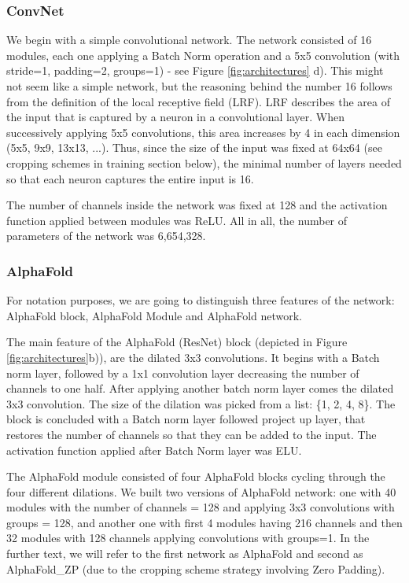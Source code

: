 \subsubsection{ConvNet}

We begin with a simple convolutional network. The network consisted of 16 modules, each one applying a Batch Norm operation and a 5x5 convolution (with stride=1, padding=2, groups=1) - see Figure \ref{fig:architectures} d). This might not seem like a simple network, but the reasoning behind the number 16 follows from the definition of the local receptive field (LRF). LRF describes the area of the input that is captured by a neuron in a convolutional layer. When successively applying 5x5 convolutions, this area increases by 4 in each dimension (5x5, 9x9, 13x13, ...). Thus, since the size of the input was fixed at 64x64 (see cropping schemes in training section below), the minimal number of layers needed so that each neuron captures the entire input is 16.

The number of channels inside the network was fixed at 128 and the activation function applied between modules was ReLU. All in all, the number of parameters of the network was 6,654,328.

\subsubsection{AlphaFold}

For notation purposes, we are going to distinguish three features of the network: AlphaFold block, AlphaFold Module and AlphaFold network.

The main feature of the AlphaFold (ResNet) block (depicted in Figure \ref{fig:architectures}b)), are the dilated 3x3 convolutions. It begins with a Batch norm layer, followed by a 1x1 convolution layer decreasing the number of channels to one half. After applying another batch norm layer comes the dilated 3x3 convolution. The size of the dilation was picked from a list: \{1, 2, 4, 8\}. The block is concluded with a Batch norm layer followed project up layer, that restores the number of channels so that they can be added to the input. The activation function applied after Batch Norm layer was ELU.

The AlphaFold module consisted of four AlphaFold blocks cycling through the four different dilations. We built two versions of AlphaFold network: one with 40 modules with the number of channels = 128 and applying 3x3 convolutions with groups = 128, and another one with first 4 modules having 216 channels and then 32 modules with 128 channels applying convolutions with groups=1. In the further text, we will refer to the first network as AlphaFold and second as AlphaFold\_ZP (due to the cropping scheme strategy involving Zero Padding). 

